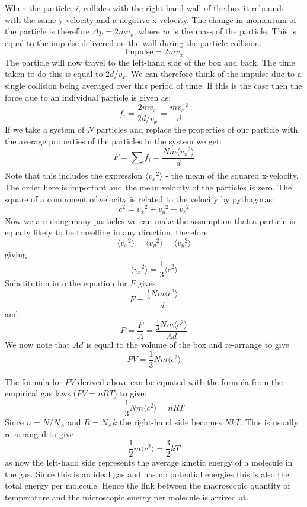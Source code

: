 \documentclass[revision-guide.tex]{subfiles}
\begin{document}
When the particle, $i$,  collides with the right-hand wall of the box it rebounds with the same y-velocity and a negative x-velocity. The change in momentum of the particle is therefore $ \Delta p = 2mv_x $, where $m$ is the mass of the particle. This is equal to the impulse delivered on the wall during the particle collision.
$$ \text{Impulse} = 2mv_x $$
The particle will now travel to the left-hand side of the box and back. The time taken to do this is equal to $2d/v_x$. We can therefore think of the impulse due to a single collision being averaged over this period of time. If this is the case then the force due to an individual particle is given as:
\[ f_i = \frac{2mv_x}{2d/v_x} = \frac{m{v_x}^2}{d}\]
If we take a system of $N$ particles and replace the properties of our particle with the average properties of the particles in the system we get:
\[ F = \sum_i f_i = \frac{Nm\langle{v_x}^2\rangle}{d}\]
Note that this includes the expression $\langle{v_x}^2\rangle$ - the mean of the squared x-velocity. The order here is important and the mean velocity of the particles is zero. The square of a component of velocity is related to the velocity by pythagoras:
\[ c^2 = {v_x}^2 + {v_y}^2 + {v_z}^2\]
Now we are using many particles we can make the assumption that a particle is equally likely to be travelling in any direction, therefore
\[ \langle{v_x}^2\rangle = \langle{v_y}^2\rangle = \langle{v_y}^2\rangle \]
giving
\[ \langle{v_x}^2\rangle = \frac{1}{3}\langle c^2 \rangle \]
Substitution into the equation for $F$ gives
\[ F = \frac{\frac{1}{3}Nm\langle c^2\rangle}{d} \]
and
\[ P = \frac{F}{A} = \frac{\frac{1}{3}Nm\langle c^2\rangle}{Ad} \]
We now note that $Ad$ is equal to the volume of the box and re-arrange to give
\[ PV = \frac{1}{3}Nm\langle c^2\rangle \]




The formula for $PV$ derived above can be equated with the formula from the empirical gas laws ($PV=nRT$) to give:
\[  \frac{1}{3}Nm\langle c^2\rangle = nRT \]
Since $n = N / N_A $ and $ R = N_A k $ the right-hand side becomes $NkT$. This is usually re-arranged to give
\[ \frac{1}{2}m\langle c^2 \rangle = \frac{3}{2}kT \]
as now the left-hand side represents the average kinetic energy of a molecule in the gas. Since this is an ideal gas and has no potential energies this is also the total energy per molecule. Hence the link between the macroscopic quantity of temperature and the microscopic energy per molecule is arrived at.
\end{document}
